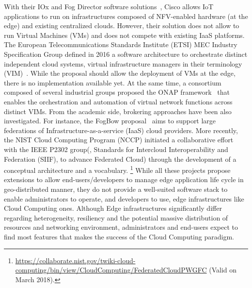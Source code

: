 With their IOx and Fog Director software
solutions~\cite{bonomi2012fog}, Cisco allows IoT applications to run
on infrastructures composed of NFV-enabled hardware (at the edge) and
existing centralized clouds. However, their solution does not allow to
run Virtual Machines (VMs) and does not compete with existing IaaS
platforms.
%
The European Telecommunications Standards Institute (ETSI) MEC
Industry Specification Group defined in 2016 a software architecture
to orchestrate distinct independent cloud systems, \aka virtual
infrastructure managers in their terminology
(VIM)~\cite{7574435}. While the proposal should allow the deployment
of VMs at the edge, there is no implementation available yet.  At the
same time, a consortium composed of several industrial groups proposed
the ONAP framework~\cite{onap} that enables the orchestration and
automation of virtual network functions across distinct VIMs.  From
the academic side, brokering approaches have been also investigated.
For instance, the FogBow proposal~\cite{brasileiro2016fogbow} aims to
support large federations of Infrastructure-as-a-service (IaaS) cloud
providers. More recently, the NIST Cloud Computing Program (NCCP)
initiated a collaborative effort with the IEEE P2302 group(, Standards for Intercloud Interoperability and
Federation (SIIF), to advance Federated Cloud) through the development
of a conceptual architecture and a vocabulary.
\footnote{\url{https://collaborate.nist.gov/twiki-cloud-computing/bin/view/CloudComputing/FederatedCloudPWGFC} (Valid on March 2018).}
%
While all these projects propose extensions to %
allow end-users/developers to manage edge application life cycle in geo-distributed
manner, they do not provide a well-suited software stack to enable
administrators to operate, and developers to use, edge infrastructures
like Cloud Computing ones.
%
Although Edge infrastructures significantly differ regarding heterogeneity, resiliency  and the potential
massive distribution of resources and networking environment,
administrators and end-users expect to find most features that makes
the success of the Cloud Computing paradigm.
%

